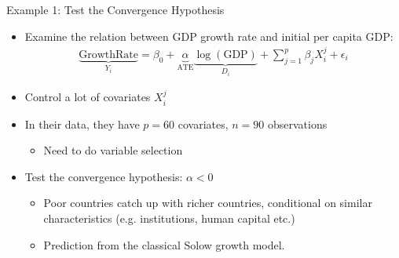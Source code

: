 \documentclass[hyperref={pdfpagelabels=false}]{beamer}
\begin{document}
	
	\begin{frame}{Example 1: Test the Convergence Hypothesis}
		\begin{itemize}
			\item Examine the relation between GDP growth rate and initial per capita GDP: 
			\begin{eqnarray*}
				\underbrace{\mbox{GrowthRate}}_{Y_{i}} = \beta_{0} + \underbrace{\alpha}_{\mbox{ATE}} \underbrace{\log(\mbox{GDP})}_{D_{i}}	+ \sum^{p}_{j=1} \beta_{j} X^{j}_{i} + \epsilon_{i}	
			\end{eqnarray*}
			
			\item Control a lot of covariates $X^{j}_{i}$	
			
			\item In their data, they have $p = 60$ covariates, $n = 90$
			observations 
			\vspace{0.2cm}
			\begin{itemize}
				\item Need to do variable selection
			\end{itemize}
			\vspace{0.2cm}
			\item Test the convergence hypothesis: $\alpha < 0$ 
			\vspace{0.2cm}
			\begin{itemize}
				\item Poor countries catch up with richer countries, conditional on similar characteristics (e.g. institutions, human capital etc.)
				
				
				\vspace{0.2cm}
				\item Prediction from the classical Solow growth model.   
			\end{itemize}
			
		\end{itemize}
	\end{frame}
	
\end{document}
